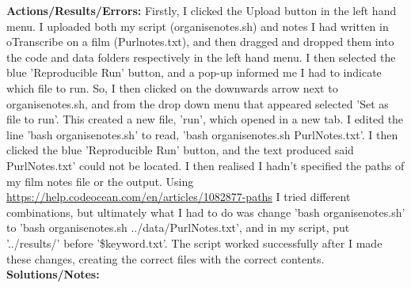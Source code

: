 \documentclass{article}
\begin{document}
\begin{FlushLeft}
\textbf{Actions/Results/Errors:} Firstly, I clicked the Upload button in the left hand menu. I uploaded both my script (organise\textunderscore notes.sh) and notes I had written in oTranscribe on a film (Purl\textunderscore notes.txt), and then dragged and dropped them into the code and data folders respectively in the left hand menu. I then selected the blue 'Reproducible Run' button, and a pop-up informed me I had to indicate which file to run. So, I then clicked on the downwards arrow next to organise\textunderscore notes.sh, and from the drop down menu that appeared selected 'Set as file to run'. This created a new file, 'run', which opened in a new tab. I edited the line 'bash organise\textunderscore notes.sh' to read, 'bash organise\textunderscore notes.sh Purl\textunderscore Notes.txt'. I then clicked the blue 'Reproducible Run' button, and the text produced said Purl\textunderscore Notes.txt' could not be located. I then realised I hadn't specified the paths of my film notes file or the output. Using \url{https://help.codeocean.com/en/articles/1082877-paths} I tried different combinations, but ultimately what I had to do was change 'bash organise\textunderscore notes.sh' to 'bash organise\textunderscore notes.sh ../data/Purl\textunderscore Notes.txt', and in my script, put '../results/' before '\$keyword.txt'. The script worked successfully after I made these changes, creating the correct files with the correct contents.\\
\textbf{Solutions/Notes:}\\

\pagebreak


\end{FlushLeft}
\end{document}

